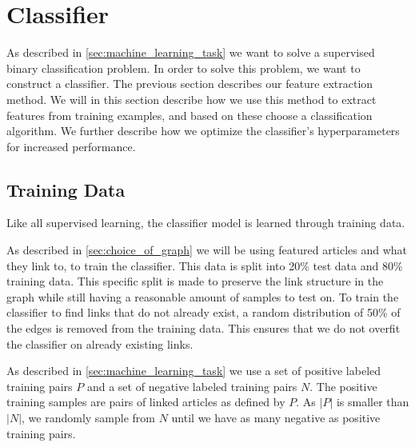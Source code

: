 \section{Classifier}\label{sec:classifier}
As described in \cref{sec:machine_learning_task} we want to solve a supervised binary classification problem. In order to solve this problem, we want to construct a classifier. The previous section describes our feature extraction method. We will in this section describe how we use this method to extract features from training examples, and based on these choose a classification algorithm. We further describe how we optimize the classifier's hyperparameters for increased performance.

\subsection{Training Data}\label{sec:training_data}
Like all supervised learning, the classifier model is learned through training data.

As described in \ref{sec:choice_of_graph} we will be using featured articles and what they link to, to train the classifier. This data is split into 20\% test data and 80\% training data. This specific split is made to preserve the link structure in the graph while still having a reasonable amount of samples to test on. To train the classifier to find links that do not already exist, a random distribution of 50\% of the edges is removed from the training data. This ensures that we do not overfit the classifier on already existing links. 

As described in \cref{sec:machine_learning_task} we use a set of positive labeled training pairs $P$ and a set of negative labeled training pairs $N$. The positive training samples are pairs of linked articles as defined by $P$. As $\left\vert{P}\right\vert$ is smaller than $\left\vert{N}\right\vert$, we randomly sample from $N$ until we have as many negative as positive training pairs.




